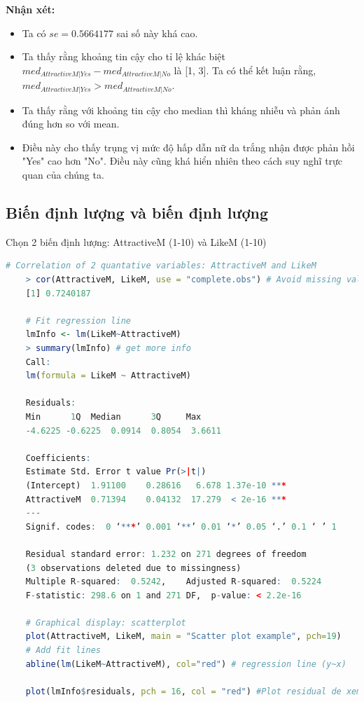 \documentclass[a4paper,12pt]{article}
\begin{document}
	\textbf{Nhận xét:}
	\begin{itemize}
		\item Ta có $se = 0.5664177$ sai số này khá cao.
		\item Ta thấy rằng khoảng tin cậy cho tỉ lệ khác biệt $med_{AttractiveM|Yes} - med_{AttractiveM|No}$ là [1, 3]. Ta có thể kết luận rằng, $med_{AttractiveM|Yes} > med_{AttractiveM|No} $.
		\item Ta thấy rằng với khoảng tin cậy cho median thì kháng nhiễu và phản ánh đúng hơn so với mean.
		\item Điều này cho thấy trụng vị mức độ hấp dẫn nữ da trắng nhận được phản hồi "Yes" cao hơn "No". Điều này cũng khá hiển nhiên theo cách suy nghĩ trực quan của chúng ta.
	\end{itemize}
	
	\subsection{Biến định lượng và biến định lượng}
	Chọn 2 biến định lượng: AttractiveM (1-10) và LikeM (1-10)
	\begin{lstlisting}[language=R]
	# Correlation of 2 quantative variables: AttractiveM and LikeM
	> cor(AttractiveM, LikeM, use = "complete.obs") # Avoid missing values
	[1] 0.7240187
	
	# Fit regression line
	lmInfo <- lm(LikeM~AttractiveM)
	> summary(lmInfo) # get more info
	Call:
	lm(formula = LikeM ~ AttractiveM)
	
	Residuals:
	Min      1Q  Median      3Q     Max 
	-4.6225 -0.6225  0.0914  0.8054  3.6611 
	
	Coefficients:
	Estimate Std. Error t value Pr(>|t|)    
	(Intercept)  1.91100    0.28616   6.678 1.37e-10 ***
	AttractiveM  0.71394    0.04132  17.279  < 2e-16 ***
	---
	Signif. codes:  0 ‘***’ 0.001 ‘**’ 0.01 ‘*’ 0.05 ‘.’ 0.1 ‘ ’ 1
	
	Residual standard error: 1.232 on 271 degrees of freedom
	(3 observations deleted due to missingness)
	Multiple R-squared:  0.5242,	Adjusted R-squared:  0.5224 
	F-statistic: 298.6 on 1 and 271 DF,  p-value: < 2.2e-16
	
	# Graphical display: scatterplot
	plot(AttractiveM, LikeM, main = "Scatter plot example", pch=19)
	# Add fit lines
	abline(lm(LikeM~AttractiveM), col="red") # regression line (y~x)
	
	plot(lmInfo$residuals, pch = 16, col = "red") #Plot residual de xem du lieu co phan bo ngau nhieu khong?
	\end{lstlisting}
	
\end{document}
